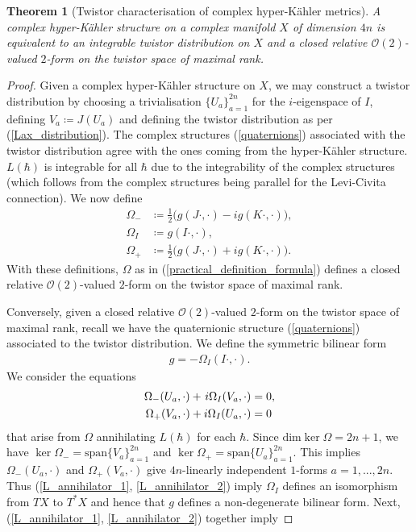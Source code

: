 \documentclass[a4paper,12pt,reqno]{amsart}
\newcounter{counter2}
\numberwithin{equation}{section}
\numberwithin{counter2}{section}
\newcounter{counter3}
\newtheorem{thm}[counter2]{Theorem}
\def\dim{\mbox{dim}}
\def\dim{\mbox{dim}}
\begin{document}
   \begin{thm}[Twistor characterisation of complex hyper-K\"ahler metrics]\label{twistor_characterisation}
   A complex hyper-K\"ahler structure on a complex manifold $X$ of dimension $4n$ is equivalent to an integrable twistor distribution on $X$ and a closed relative $\mathcal{O}(2)$-valued $2$-form on the twistor space of maximal rank.  
   \end{thm}
     \begin{proof}
  Given a complex hyper-K\"ahler structure on $X$,  we may construct a twistor distribution by choosing a trivialisation $\{U_a\}_{a=1}^{2n}$ for the $i$-eigenspace of $I$,  defining $V_a \coloneqq J(U_a)$ and defining the twistor distribution as per (\ref{Lax_distribution}).  The complex structures (\ref{quaternions}) associated with the twistor distribution agree with the ones coming from the hyper-K\"ahler structure.  $L(\hbar)$ is integrable for all $\hbar$ due to the integrability of the complex structures (which follows from the complex structures being parallel for the Levi-Civita connection).  We now define 
  \begin{align}
  \Omega_- &\coloneqq \frac{1}{2}\big(g(J\cdot,\cdot)-ig(K\cdot,\cdot)\big), \\
  \Omega_I &\coloneqq g(I\cdot,\cdot), \\
  \Omega_+ &\coloneqq  \frac{1}{2}\big(g(J\cdot,\cdot)+ig(K\cdot,\cdot)\big).  
  \end{align}
  With these definitions,  $\Omega$ as in (\ref{practical_definition_formula}) defines a closed relative $\mathcal{O}(2)$-valued $2$-form on the twistor space of maximal rank.  \par 
  Conversely,  given a closed relative $\mathcal{O}(2)$-valued $2$-form on the twistor space of maximal rank,  recall we have the quaternionic structure (\ref{quaternions}) associated to the twistor distribution.  We define the symmetric bilinear form
  \begin{align}
  g = -\Omega_I(I\cdot,\cdot). 
  \end{align}
We consider the equations
  \begin{align}
 \Omega_-(U_a,\cdot) + \hspace{0.4mm} i\Omega_I(V_a,\cdot) &= 0,  \label{L_annihilator_1} \\ 
  \Omega_+(V_a,\cdot) + i\Omega_I(U_a,\cdot) &= 0 \label{L_annihilator_2}
  \end{align}
  that arise from $\Omega$ annihilating $L(\hbar)$ for each $\hbar$.  Since $\dim \ker \Omega = 2n + 1$,  we have $\ker \Omega_- = \text{span}\{V_a\}_{a=1}^{2n}$ and $\ker \Omega_+ = \text{span}\{U_a\}_{a=1}^{2n}$.  This implies  $  \Omega_-(U_a,\cdot)$ and $ \Omega_+(V_a,\cdot)$ give $4n$-linearly independent $1$-forms $a = 1,...,2n$.  Thus (\ref{L_annihilator_1},  \ref{L_annihilator_2}) imply  $\Omega_I$ defines an isomorphism from $TX$ to $T^*X$ and hence that $g$ defines a non-degenerate bilinear form.   Next,  (\ref{L_annihilator_1},  \ref{L_annihilator_2}) together imply 

\end{proof}
\end{document}
